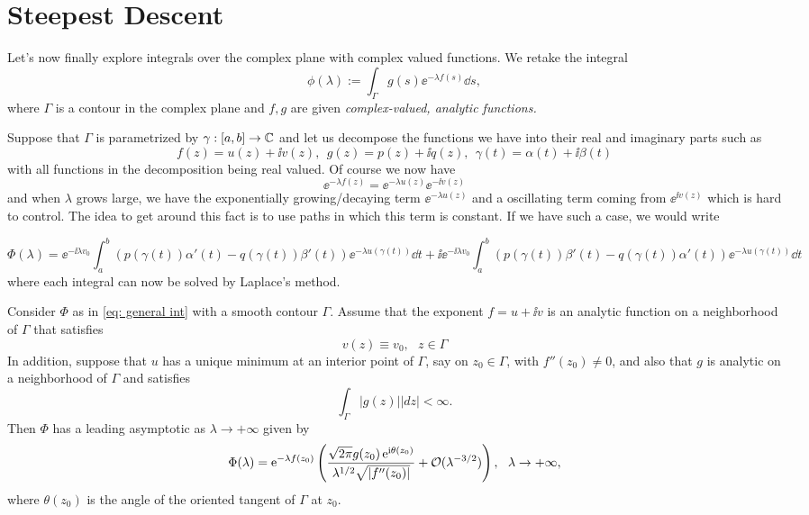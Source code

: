 \section{Steepest Descent}

Let's now finally explore integrals over the complex plane with complex valued functions. We retake the integral 
\begin{equation}
	\phi(\lambda) := \int_{\Gamma} g(s) \ee^{-\lambda f(s)} \dd s,
	\label{eq: general int}
\end{equation}
where $\Gamma$ is a contour in the complex plane and $f, g$ are given \textit{complex-valued, analytic functions.}

Suppose that $\Gamma$ is parametrized by $\gamma : [a,b] \rightarrow \mathbb{C}$ and let us decompose the functions we have into their real and imaginary parts such as
$$f(z) = u(z) + \ii v(z), \ \ g(z) = p(z) + \ii q(z), \ \ \gamma(t) = \alpha(t) + \ii \beta(t)$$
with all functions in the decomposition being real valued. Of course we now have 
$$\ee^{-\lambda f(z)} = \ee^{-\lambda u(z)} \ee^{-\ii v(z)}$$
and when $\lambda$ grows large, we have the exponentially growing/decaying term $\ee^{-\lambda u(z)}$ and a oscillating term coming from $\ee^{\ii v(z)}$ which is hard to control. The idea to get around this fact is to use paths in which this term is constant. If we have such a case, we would write

\begin{equation}
	\Phi(\lambda) = \ee^{-\ii \lambda v_0} \int_{a}^{b} (p(\gamma(t))\alpha'(t)-q(\gamma(t))\beta'(t)) \ee^{-\lambda u(\gamma(t))} \dd t + \ii \ee^{-\ii \lambda v_0} \int_{a}^{b} (p(\gamma(t))\beta'(t)-q(\gamma(t))\alpha'(t)) \ee^{-\lambda u(\gamma(t))} \dd t
	\label{eq: decomposition}
\end{equation}
where each integral can now be solved by Laplace's method.

\begin{thm}
	Consider $\Phi$ as in \ref{eq: general int} with a smooth contour $\Gamma$. Assume that the exponent $f = u + \ii v$ is an analytic function on a neighborhood of $\Gamma$ that satisfies
	$$v(z) \equiv v_0, \ \ \ z \in \Gamma$$
	In addition, suppose that $u$ has a unique minimum at an interior point of $\Gamma$, say on $z_0 \in \Gamma$, with $f''(z_0) \neq 0$, and also that $g$ is analytic on a neighborhood of $\Gamma$  and satisfies
	$$\int_{\Gamma} |g(z)| |dz| < \infty.$$
	Then $\Phi$ has a leading asymptotic as $\lambda \rightarrow +\infty$ given by
	$$\Phi(\lambda) = \operatorname{e}^{-\lambda f(z_0)} \left(\frac{\sqrt{2\pi}g(z_0)\operatorname{e}^{\mathrm{i} \theta(z_0)}}{\lambda^{1/2}\sqrt{|f''(z_0)|}} + \mathcal{O}(\lambda^{-3/2}) \right), \ \ \lambda \rightarrow + \infty,$$
	where $\theta(z_0)$ is the angle of the oriented tangent of $\Gamma$ at $z_0$.
\end{thm}

